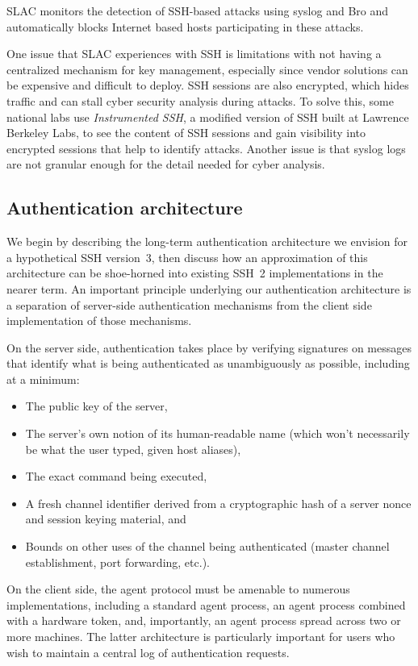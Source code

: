 \documentclass[11pt]{article}
\begin{document}
SLAC monitors the detection of SSH-based attacks using syslog and Bro
and automatically blocks Internet based hosts participating in these
attacks.

One issue that SLAC experiences with SSH is limitations with not
having a centralized mechanism for key management, especially since
vendor solutions can be expensive and difficult to deploy. SSH
sessions are also encrypted, which hides traffic and can stall cyber
security analysis during attacks. To solve this, some national labs
use \emph{Instrumented SSH}, a modified version of SSH built at
Lawrence Berkeley Labs, to see the content of SSH sessions and gain
visibility into encrypted sessions that help to identify
attacks. Another issue is that syslog logs are not granular enough for
the detail needed for cyber analysis.

\subsection{Authentication architecture}

We begin by describing the long-term authentication architecture we
envision for a hypothetical SSH version~3, then discuss how an
approximation of this architecture can be shoe-horned into existing
SSH~2 implementations in the nearer term.  An important principle
underlying our authentication architecture is a separation of
server-side authentication mechanisms from the client side
implementation of those mechanisms.

On the server side, authentication takes place by verifying signatures
on messages that identify what is being authenticated as unambiguously
as possible, including at a minimum:
\begin{itemize}\itemsep=0pt
\item The public key of the server,
\item The server's own notion of its human-readable name (which won't
  necessarily be what the user typed, given host aliases),
\item The exact command being executed,
\item A fresh channel identifier derived from a cryptographic hash of
  a server nonce and session keying material, and
\item Bounds on other uses of the channel being authenticated (master
  channel establishment, port forwarding, etc.).
\end{itemize}

On the client side, the agent protocol must be amenable to numerous
implementations, including a standard agent process, an agent process
combined with a hardware token, and, importantly, an agent process
spread across two or more machines.  The latter architecture is
particularly important for users who wish to maintain a central log of
authentication requests.
\end{document}
